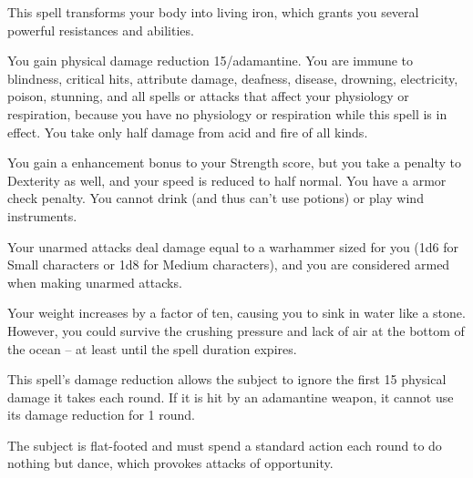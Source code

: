 \spellrng{\rngpers}
\begin{spelleffect}
  This spell transforms your body into living iron, which grants you several powerful resistances and abilities.
  \par You gain physical damage reduction 15/adamantine. You are immune to blindness, critical hits, attribute damage, deafness, disease, drowning, electricity, poison, stunning, and all spells or attacks that affect your physiology or respiration, because you have no physiology or respiration while this spell is in effect. You take only half damage from acid and fire of all kinds.
  \par You gain a  enhancement bonus to your Strength score, but you take a  penalty to Dexterity as well, and your speed is reduced to half normal. You have a  armor check penalty. You cannot drink (and thus can't use potions) or play wind instruments.
  \par Your unarmed attacks deal damage equal to a warhammer sized for you (1d6 for Small characters or 1d8 for Medium characters), and you are considered armed when making unarmed attacks.
  \par Your weight increases by a factor of ten, causing you to sink in water like a stone. However, you could survive the crushing pressure and lack of air at the bottom of the ocean -- at least until the spell duration expires.
\end{spelleffect}
\begin{spellnotes}
  This spell's damage reduction allows the subject to ignore the first 15 physical damage it takes each round. If it is hit by an adamantine weapon, it cannot use its damage reduction for 1 round.
\end{spellnotes}

\spellrng{\rngclose}
\begin{spelleffect}
  The subject is flat-footed and must spend a standard action each round to do nothing but dance, which provokes attacks of opportunity.
\end{spelleffect}

